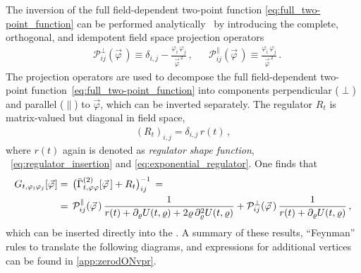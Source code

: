 The inversion of the full field-dependent two-point function \eqref{eq:full_two-point_function} can be performed analytically~\cite{Tetradis:1995br,Wetterich:1991be,PawlowskiScript,Delamotte:2007pf} by introducing the complete, orthogonal, and idempotent field space projection operators
	\begin{align}
		&	\mathcal{P}^\perp_{i j} ( \vec{\varphi} \, ) \equiv \delta_{i, j} - \frac{\varphi_i\, \varphi_j}{\vec{\varphi}^{\, 2}} \, ,	&&	\mathcal{P}^\parallel_{i j} ( \vec{\varphi} \, ) \equiv \frac{\varphi_i\, \varphi_j}{\vec{\varphi}^{\, 2}} \, .	\label{eq:field_space_projection_operators}
	\end{align}
The projection operators are used to decompose the full field-dependent two-point function~\eqref{eq:full_two-point_function} into components perpendicular ($\perp$) and parallel ($\parallel$) to $\vec{\varphi}$, which can be inverted separately.
The regulator $R_t$ is matrix-valued but diagonal in field space,
	\begin{align}
		( R_t )_{i, j} = \delta_{i, j} \, r ( t ) \, ,\label{eq:0dONR}
	\end{align}
where $r ( t )$ again is denoted as \textit{regulator shape function}, \cf{}\ \cref{eq:regulator_insertion} and \eqref{eq:exponential_regulator}.
One finds that
	\begin{align}
		G_{t,\varphi_i\varphi_j}[ \vec{\varphi}\mskip1.0mu ] &= \,\big( \bar{\Gamma}^{(2)}_{t,\varphi \varphi} [ \vec{\varphi} \, ] + R_{t} \big)^{-1}_{i j} \, = \notag\\
	&= \, \mathcal{P}^\parallel_{i j} ( \vec{\varphi} \, ) \, \frac{1}{ r ( t ) + \partial_\varrho U ( t, \varrho ) + 2 \varrho \, \partial_\varrho^2 U ( t, \varrho ) } 
		 + \mathcal{P}^\perp_{i j} ( \vec{\varphi} \, ) \, \frac{1}{ r(t) + \partial_\varrho U ( t, \varrho ) } \, , \label{eq:0dONG}
	\end{align}
which can be inserted directly into the \frgEquation{}.
A summary of these results, ``Feynman'' rules to translate the following diagrams, and expressions for additional vertices can be found in \cref{app:zerodONvpr}.

